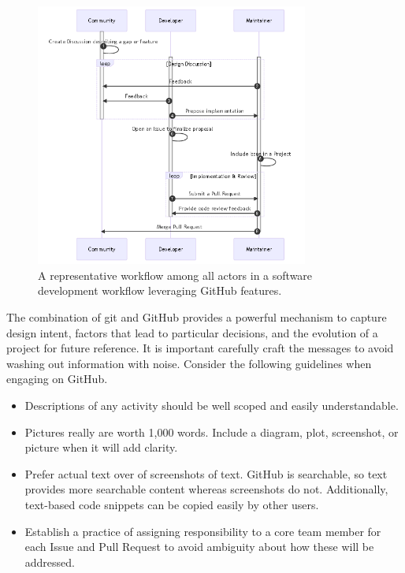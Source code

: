 \documentclass[]{nrel}
\begin{document}
\begin{figure}[htbp]
\begin{center}
\includegraphics[width=0.8\textwidth]{mermaid-bfcb6a9556227d6b8158e111ddd0f37e43e4f635.png}
\caption{A representative workflow among all actors in a software development workflow leveraging GitHub features.}
\label{fig:dev_sequence}
\end{center}
\end{figure}

The combination of git and GitHub provides a powerful mechanism to capture design intent,
factors that lead to particular decisions, and the evolution of a project for future reference.
It is important carefully craft the messages to avoid washing out information with noise.
Consider the following guidelines when engaging on GitHub.

\begin{itemize}
\item Descriptions of any activity should be well scoped and easily understandable.
\item Pictures really are worth 1,000 words. Include a diagram, plot, screenshot, or picture
when it will add clarity.
\item Prefer actual text over of screenshots of text. GitHub is searchable, so text provides more
searchable content whereas screenshots do not. Additionally, text-based code snippets can be
copied easily by other users.
\item Establish a practice of assigning responsibility to a core team member for each Issue and
Pull Request to avoid ambiguity about how these will be addressed.

\end{itemize}
\end{document}
